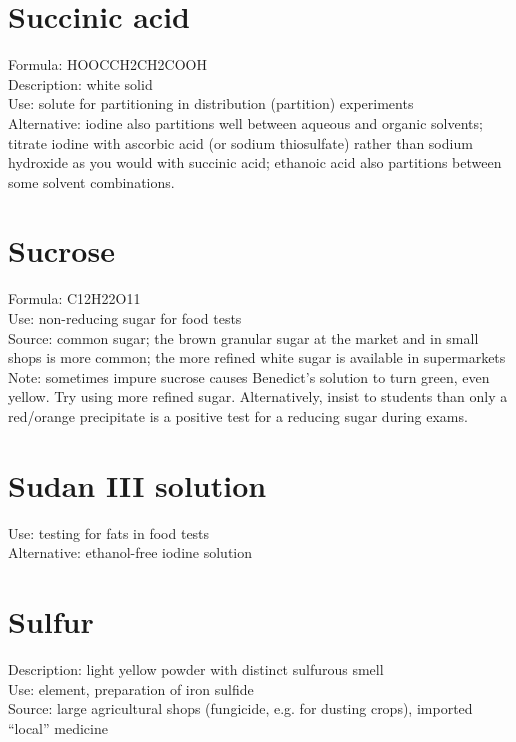 \section{Succinic acid}
Formula: HOOCCH2CH2COOH\\
Description: white solid\\
Use: solute for partitioning in distribution (partition) experiments\\
Alternative: iodine also partitions well between aqueous and organic solvents; 
titrate iodine with ascorbic acid (or sodium thiosulfate) 
rather than sodium hydroxide as you would with succinic acid; 
ethanoic acid also partitions between some solvent combinations.

\section{Sucrose}
Formula: C12H22O11\\
Use: non-reducing sugar for food tests\\
Source: common sugar; 
the brown granular sugar at the market and in small shops is more common; 
the more refined white sugar is available in supermarkets\\
Note: sometimes impure sucrose causes Benedict's solution to turn green, 
even yellow. Try using more refined sugar.
Alternatively, insist to students than only a red/orange precipitate 
is a positive test for a reducing sugar during exams.

\section{Sudan III solution}
Use: testing for fats in food tests\\
Alternative: ethanol-free iodine solution

\section{Sulfur}
Description: light yellow powder with distinct sulfurous smell\\
Use: element, 
preparation of iron sulfide\\
Source: large agricultural shops (fungicide, 
e.g. 
for dusting crops), 
imported “local” medicine

